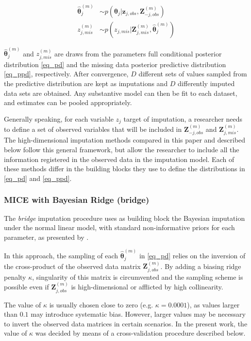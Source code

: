 	\begin{align}
	\hat{\bm{\theta}}_{j}^{(m)} &\sim 
		p(\bm{\theta}_j | \bm{z}_{j, obs}, \bm{Z}_{-j, obs}^{(m)}) 
		\label{eq_pd}\\
	z_{j, mis}^{(m)} &\sim 
		p(z_{j, mis} | \bm{Z}_{j, mis}^{(m)}, \hat{\bm{\theta}}_{j}^{(m)}) 
		\label{eq_ppd}
	\end{align}

$\hat{\bm{\theta}}_{j}^{(m)}$ and $z_{j, mis}^{(m)}$ are draws from the parameters full conditional posterior 
distribution \eqref{eq_pd} and the missing data posterior predictive distribution \eqref{eq_ppd}, respectively.
After convergence, $D$ different sets of values sampled from the predictive distribution are kept as imputations 
and $D$ differently imputed data sets are obtained. 
Any substantive model can then be fit to each dataset, and estimates can be pooled appropriately.

Generally speaking, for each variable $z_j$ target of imputation, a researcher needs to define a set of 
observed variables that will be included in $\bm{Z}_{-j, obs}^{(m)}$ and $\bm{Z}_{j, mis}^{(m)}$.
The high-dimensional imputation methods compared in this paper and described below follow this general framework,
but allow the researcher to include all the information registered in the observed data in the imputation model.
Each of these methods differ in the building blocks they use to define the distributions in \eqref{eq_pd} and 
\eqref{eq_ppd}.

\subsubsection{MICE with Bayesian Ridge (bridge)}
	The \emph{bridge} imputation procedure uses as building block the Bayesian imputation under the normal 
	linear model, with standard non-informative priors for each parameter, as presented by \cite[p. 68, 
	algorithm 3.1]{vanBuuren:2012}.

	In this approach, the sampling of each $\hat{\bm{\theta}}_{j}^{(m)}$ in \eqref{eq_pd} relies on the inversion
	of the cross-product of the observed data matrix $\bm{Z}_{j, obs}^{(m)}$.
	By adding a biasing ridge penalty $\kappa$, singularity of this matrix is circumvented and the sampling scheme is 
	possible even if $\bm{Z}_{j, obs}^{(m)}$ is high-dimensional or afflicted by high collinearity.

	The value of $\kappa$ is usually chosen close to zero (e.g. $\kappa = 0.0001$), as values larger than $0.1$ 
	may introduce systematic bias. 
	However, larger values may be necessary to invert the observed data matrices in certain scenarios.
	In the present work, the value of $\kappa$ was decided by means of a cross-validation procedure
	described below.

